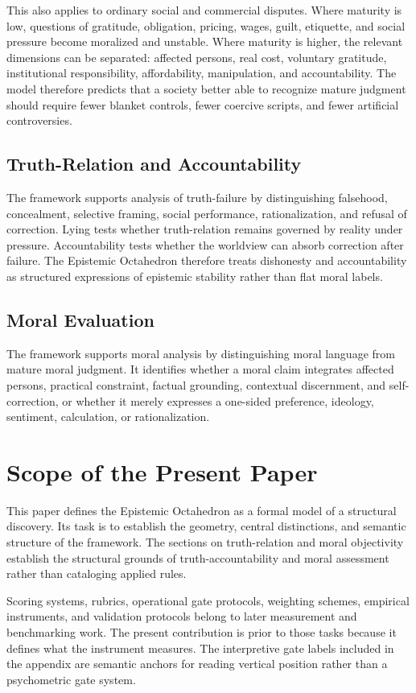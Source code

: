 \documentclass[11pt]{article}
\begin{document}
This also applies to ordinary social and commercial disputes. Where maturity is low, questions of gratitude, obligation, pricing, wages, guilt, etiquette, and social pressure become moralized and unstable. Where maturity is higher, the relevant dimensions can be separated: affected persons, real cost, voluntary gratitude, institutional responsibility, affordability, manipulation, and accountability. The model therefore predicts that a society better able to recognize mature judgment should require fewer blanket controls, fewer coercive scripts, and fewer artificial controversies.

\subsection{Truth-Relation and Accountability}
The framework supports analysis of truth-failure by distinguishing falsehood, concealment, selective framing, social performance, rationalization, and refusal of correction. Lying tests whether truth-relation remains governed by reality under pressure. Accountability tests whether the worldview can absorb correction after failure. The Epistemic Octahedron therefore treats dishonesty and accountability as structured expressions of epistemic stability rather than flat moral labels.

\subsection{Moral Evaluation}
The framework supports moral analysis by distinguishing moral language from mature moral judgment. It identifies whether a moral claim integrates affected persons, practical constraint, factual grounding, contextual discernment, and self-correction, or whether it merely expresses a one-sided preference, ideology, sentiment, calculation, or rationalization.

\section{Scope of the Present Paper}

This paper defines the Epistemic Octahedron as a formal model of a structural discovery. Its task is to establish the geometry, central distinctions, and semantic structure of the framework. The sections on truth-relation and moral objectivity establish the structural grounds of truth-accountability and moral assessment rather than cataloging applied rules.

Scoring systems, rubrics, operational gate protocols, weighting schemes, empirical instruments, and validation protocols belong to later measurement and benchmarking work. The present contribution is prior to those tasks because it defines what the instrument measures. The interpretive gate labels included in the appendix are semantic anchors for reading vertical position rather than a psychometric gate system.
\end{document}
